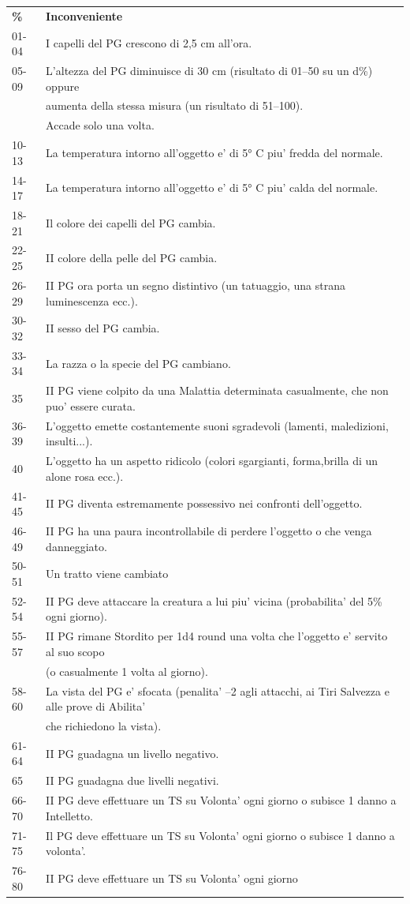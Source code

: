 \documentclass[a4paper,11pt,twoside,openany]{book}
\begin{document}
{		%
		\begin{tabular}{ll}	
			\toprule
			\textbf{\%} & \textbf{Inconveniente}\tabularnewline
			01-04 & I capelli del PG crescono di 2,5 cm all'ora.\tabularnewline
			05-09 & L'altezza del PG diminuisce di 30 cm (risultato di 01--50
			su un d\%) oppure \\
			&aumenta della stessa misura (un risultato di 51--100).\\
			&Accade solo una volta.\tabularnewline
			10-13 & La temperatura intorno all'oggetto e' di 5° C piu' fredda del normale.\tabularnewline
			14-17 & La temperatura intorno all'oggetto e' di 5° C piu' calda del normale.\tabularnewline
			18-21 & Il colore dei capelli del PG cambia.\tabularnewline
			22-25 & II colore della pelle del PG cambia.\tabularnewline
			26-29 & II PG ora porta un segno distintivo (un tatuaggio, una strana
			luminescenza ecc.).\tabularnewline
			30-32 & II sesso del PG cambia.\tabularnewline
			33-34 & La razza o la specie del PG cambiano.\tabularnewline
			35 & II PG viene colpito da una Malattia determinata casualmente,
			che non puo' essere curata.\tabularnewline
			36-39 & L'oggetto emette costantemente suoni sgradevoli (lamenti, maledizioni, insulti...).\tabularnewline
			40 & L'oggetto ha un aspetto ridicolo (colori sgargianti, forma,brilla di un alone rosa ecc.).\tabularnewline
			41-45 & II PG diventa estremamente possessivo nei confronti dell'oggetto.\tabularnewline
			46-49 & II PG ha una paura incontrollabile di perdere l'oggetto o
			che venga danneggiato.\tabularnewline
			50-51 & Un tratto viene cambiato\tabularnewline
			52-54 & II PG deve attaccare la creatura a lui piu' vicina (probabilita'
			del 5\% ogni giorno).\tabularnewline
			55-57 & II PG rimane Stordito per 1d4 round una volta che l'oggetto
			e' servito al suo scopo\\
			&(o casualmente 1 volta al giorno).\tabularnewline
			58-60 & La vista del PG e' sfocata (penalita' --2 agli attacchi,
			ai Tiri Salvezza e alle prove di Abilita'\\
			&che richiedono la vista).\tabularnewline
			61-64 & II PG guadagna un livello negativo.\tabularnewline
			65 & II PG guadagna due livelli negativi.\tabularnewline
			66-70 & II PG deve effettuare un TS su Volonta' ogni giorno
			o subisce 1 danno a Intelletto.\tabularnewline
			71-75 & Il PG deve effettuare un TS su Volonta' ogni giorno
			o subisce 1 danno a volonta'.\tabularnewline
			76-80 & II PG deve effettuare un TS su Volonta' ogni giorno

\end{tabular}}
\end{document}

